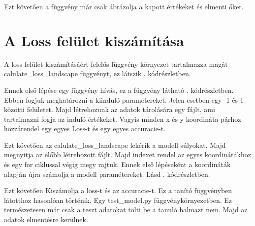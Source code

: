 \documentclass[twoside,a4paper]{refart}
\begin{document}
	{\small }
	
	Ezt követően a függvény már csak ábrázolja a kapott értékeket és elmenti őket.
	
\section{A Loss felület kiszámítása}
	
	A loss felület kiszámításáért felelős függvény környezet tartalmazza magát calulate\_loss\_landscape függvényt, ez látszik . kódrészletben.
	
	{\small }
	
	Ennek első lépése egy függvény hívás, ez a függvény látható . kódrészletben. Ebben fogjuk meghatározni a kiinduló paramétereket. Jelen esetben egy -1 és 1 közötti felületet. Majd létrehozunk az adatok tárolására egy fájlt, ami tartalmazni fogja az induló értékeket. Vagyis minden x és y koordináta párhoz hozzárendel egy egyes Loss-t és egy egyes accuracie-t.
	
	{\small }
	
	Ezt követően az calulate\_loss\_landscape lekérik a modell súlyokat. Majd megnyitja az előbb létrehozott fájlt. Majd indexet rendel az egyes koordinátákhoz és egy for ciklussal végig megy rajtuk. Ennek első lépéseként a koordináták alapján újra számolja a modell paramétereket. Lásd . kódrészletben. 
	
	{\small }
	
	Ezt követően Kiszámolja a loss-t és az accuracie-t. Ez a tanító függvényben látotthoz hasonlóan történik. Egy test\_model.py függvénykörnyezetben. Ez természetesen már csak a teszt adatokat tölti be a tanuló halmazt nem. Majd az adatok elmentésre kerülnek.
	
\end{document}
